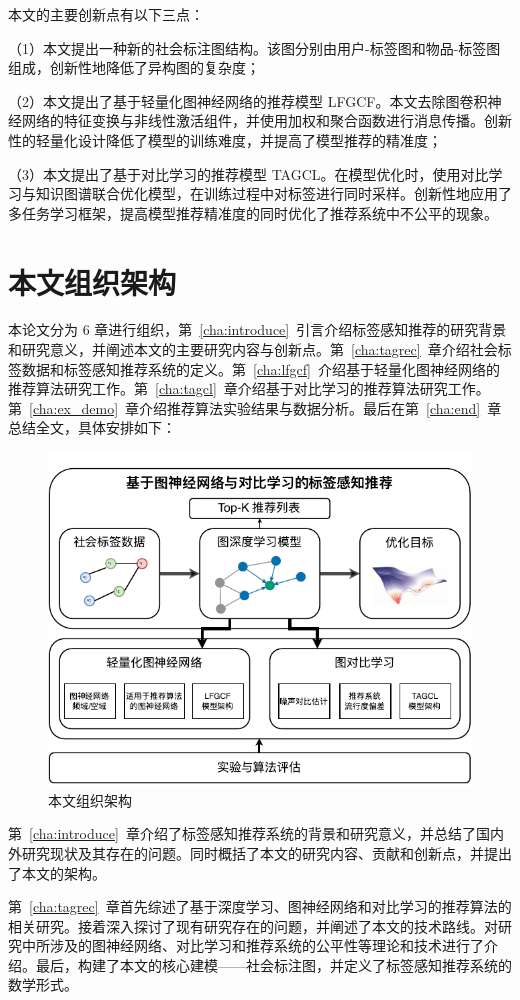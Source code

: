 本文的主要创新点有以下三点：

（1）本文提出一种新的社会标注图结构。该图分别由用户-标签图和物品-标签图组成，创新性地降低了异构图的复杂度；

（2）本文提出了基于轻量化图神经网络的推荐模型 LFGCF。本文去除图卷积神经网络的特征变换与非线性激活组件，并使用加权和聚合函数进行消息传播。创新性的轻量化设计降低了模型的训练难度，并提高了模型推荐的精准度；

（3）本文提出了基于对比学习的推荐模型 TAGCL。在模型优化时，使用对比学习与知识图谱联合优化模型，在训练过程中对标签进行同时采样。创新性地应用了多任务学习框架，提高模型推荐精准度的同时优化了推荐系统中不公平的现象。

\section{本文组织架构}
本论文分为 6 章进行组织，第~\ref{cha:introduce}~引言介绍标签感知推荐的研究背景和研究意义，并阐述本文的主要研究内容与创新点。第~\ref{cha:tagrec}~章介绍社会标签数据和标签感知推荐系统的定义。第~\ref{cha:lfgcf}~介绍基于轻量化图神经网络的推荐算法研究工作。第~\ref{cha:tagcl}~章介绍基于对比学习的推荐算法研究工作。第~\ref{cha:ex_demo}~章介绍推荐算法实验结果与数据分析。最后在第~\ref{cha:end}~章总结全文，具体安排如下：
\begin{figure}[!h]
    \centering
    \setlength{\belowcaptionskip}{-6mm}
    \includegraphics[width=0.7\linewidth]{figure/structure.drawio.pdf}
    \caption{本文组织架构}
    \label{fig:structure}
\end{figure}

第~\ref{cha:introduce}~章介绍了标签感知推荐系统的背景和研究意义，并总结了国内外研究现状及其存在的问题。同时概括了本文的研究内容、贡献和创新点，并提出了本文的架构。

第~\ref{cha:tagrec}~章首先综述了基于深度学习、图神经网络和对比学习的推荐算法的相关研究。接着深入探讨了现有研究存在的问题，并阐述了本文的技术路线。对研究中所涉及的图神经网络、对比学习和推荐系统的公平性等理论和技术进行了介绍。最后，构建了本文的核心建模——社会标注图，并定义了标签感知推荐系统的数学形式。

